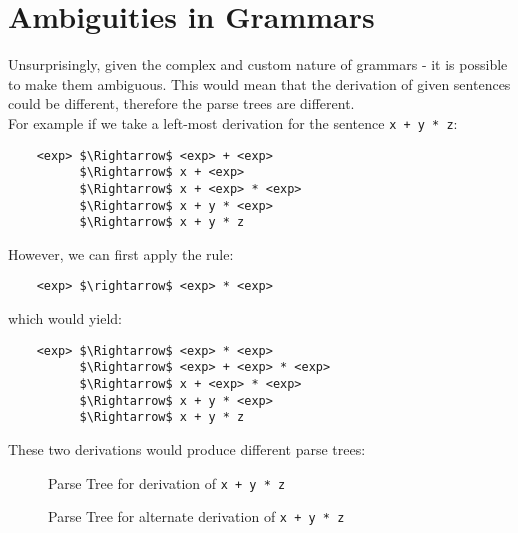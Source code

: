 
\section{Ambiguities in Grammars}
Unsurprisingly, given the complex and custom nature of grammars - it is possible to make them ambiguous. This would mean that the derivation of given sentences could be different, therefore the parse trees are different.\\

For example if we take a left-most derivation for the sentence \verb|x + y * z|:
\begin{lstlisting}
    <exp> $\Rightarrow$ <exp> + <exp>
          $\Rightarrow$ x + <exp>
          $\Rightarrow$ x + <exp> * <exp>
          $\Rightarrow$ x + y * <exp>
          $\Rightarrow$ x + y * z
\end{lstlisting}
However, we can first apply the rule:
\begin{lstlisting}
    <exp> $\rightarrow$ <exp> * <exp>
\end{lstlisting}
which would yield:
\begin{lstlisting}
    <exp> $\Rightarrow$ <exp> * <exp>
          $\Rightarrow$ <exp> + <exp> * <exp>
          $\Rightarrow$ x + <exp> * <exp>
          $\Rightarrow$ x + y * <exp>
          $\Rightarrow$ x + y * z
\end{lstlisting}

These two derivations would produce different parse trees:
\begin{figure}[H]
\centering
{}
\caption{Parse Tree for derivation of \texttt{x + y * z}}
\end{figure}

\begin{figure}[H]
\centering
{}
\caption{Parse Tree for alternate derivation of \texttt{x + y * z}}
\end{figure}


